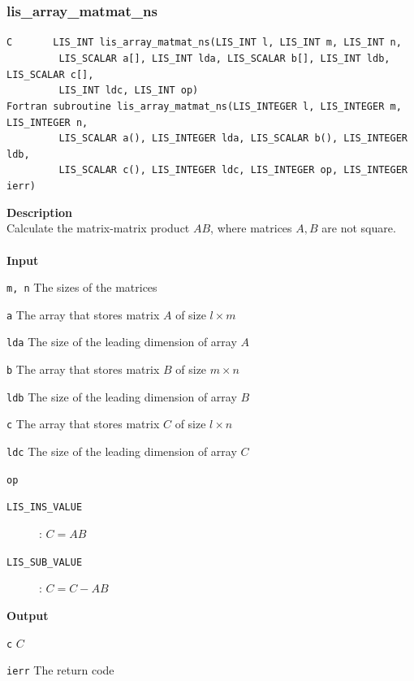 \documentclass[a4paper]{article}
\newcommand{\namelistlabel}[1]{\mbox{#1}\hfill}
\newenvironment{namelist}[1]{%
\begin{list}{}
  {\let\makelabel\namelistlabel
  \settowidth{\labelwidth}{#1}
  \setlength{\leftmargin}{1.1\labelwidth}}
  }{%
\end{list}}
\begin{document}
\subsubsection{lis\_array\_matmat\_ns}
\begin{screen}
\verb|C       LIS_INT lis_array_matmat_ns(LIS_INT l, LIS_INT m, LIS_INT n,|\\
\verb|         LIS_SCALAR a[], LIS_INT lda, LIS_SCALAR b[], LIS_INT ldb, LIS_SCALAR c[],|\\
\verb|         LIS_INT ldc, LIS_INT op)|\\
\verb|Fortran subroutine lis_array_matmat_ns(LIS_INTEGER l, LIS_INTEGER m, LIS_INTEGER n,|\\
\verb|         LIS_SCALAR a(), LIS_INTEGER lda, LIS_SCALAR b(), LIS_INTEGER ldb,|\\
\verb|         LIS_SCALAR c(), LIS_INTEGER ldc, LIS_INTEGER op, LIS_INTEGER ierr)|
\end{screen}
{\bf Description}\\
\indent
Calculate the matrix-matrix product $AB$, where matrices $A, B$ are not square.
\\ \\
\noindent
{\bf Input}
\begin{namelist}{XXXXXXXXXXXXXXXXXXXX}
\item[\tt m, n] The sizes of the matrices
\item[\tt a] The array that stores matrix $A$ of size $l \times m$
\item[\tt lda] The size of the leading dimension of array $A$
\item[\tt b] The array that stores matrix $B$ of size $m \times n$
\item[\tt ldb] The size of the leading dimension of array $B$
\item[\tt c] The array that stores matrix $C$ of size $l \times n$
\item[\tt ldc] The size of the leading dimension of array $C$  
\item[\tt op] \begin{description}
\item[\tt LIS\_INS\_VALUE]: $C = AB$
\item[\tt LIS\_SUB\_VALUE]: $C = C - AB$
\end{description}
\end{namelist}
{\bf Output}
\begin{namelist}{XXXXXXXXXXXXXXXXXXXX}
\item[\tt c] $C$
\item[\tt ierr] The return code
\end{namelist}
\end{document}
